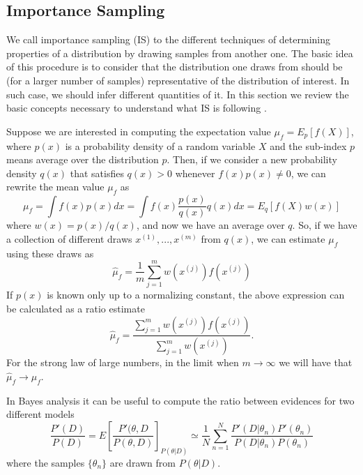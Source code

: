 \documentclass[onecolumn,           %
               showpacs,            %
               preprintnumbers,     %
               aps,                 %
               prl,          	    %
               letterpaper,             %
               superscriptaddress,      %
               nofootinbib,         %
               tightenlines,        %
               floats,floatfix      %
               ,usenatbib,
               ]{revtex4-1}
\begin{document}
\subsection{Importance Sampling}

We call importance sampling (IS) to the different techniques of determining properties of a distribution by drawing samples from another one. The basic idea of this procedure is to consider that the distribution one draws from should be (for a larger number of samples) representative of the distribution of interest. In such case, we should infer different quantities of it. In this section we review the basic concepts necessary to understand what IS is following \cite{importancesampling}.

Suppose we are interested in computing the expectation value $\mu_f=E_p[f(X)]$, where $p(x)$ is a probability density of a random variable $X$ and the sub-index $p$ means average over the distribution $p$. Then, if we consider a new probability density $q(x)$ that satisfies $q(x)>0$ whenever $f(x)p(x)\not = 0$, we can rewrite the mean value $\mu_f$ as
\begin{equation}
\mu_f = \int f(x)p(x)dx=\int f(x)\frac{p(x)}{q(x)}q(x)dx=E_q[f(X)w(x)]
\end{equation}
where $w(x)=p(x)/q(x)$, and now we have an average over $q$. So, if we have a collection of different draws $x^{(1)},...,x^{(m)}$ from $q(x)$, we can estimate $\mu_f$ using these draws as
\begin{equation}
\hat \mu_f = \frac{1}{m}\sum_{j=1}^m w(x^{(j)})f(x^{(j)})
\end{equation}
If $p(x)$ is known only up to a normalizing constant, the above expression can be calculated  as a ratio estimate
\begin{equation}
\hat \mu_f=\frac{\sum_{j=1}^m w(x^{(j)})f(x^{(j)})}{\sum_{j=1}^mw(x^{(j)})}.
\end{equation}
For the strong law of large numbers, in the limit when $m\rightarrow \infty$ we will have that $\hat \mu_f\rightarrow \mu_f$.

In Bayes analysis it can be useful to compute the ratio between evidences for two different models
\begin{equation}\label{importanceratio}
\frac{P'(D)}{P(D)}=E\left[\frac{P'(\theta,D}{P(\theta,D)}\right]_{P(\theta|D)}\simeq \frac{1}{N}\sum_{n=1}^N\frac{P'(D|\theta_n)P'(\theta_n)}{P(D|\theta_n)P(\theta_n)}
\end{equation}
where the samples $\lbrace\theta_n\rbrace$ are drawn from $P(\theta|D)$.
\end{document}
